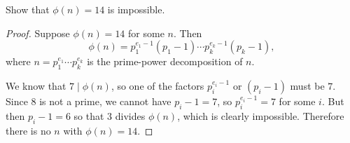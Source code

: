  Show that $\phi(n) = 14$ is impossible.
\begin{proof}
  Suppose $\phi(n) = 14$ for some $n$. Then
  \begin{equation*}
    \phi(n) = p_1^{e_1-1}(p_1 - 1)\cdots p_k^{e_k-1}(p_k - 1),
  \end{equation*}
  where $n = p_1^{e_1}\cdots p_k^{e_k}$ is the prime-power
  decomposition of $n$.

  We know that $7\mid\phi(n)$, so one of the factors $p_i^{e_i-1}$ or
  $(p_i-1)$ must be $7$. Since $8$ is not a prime, we cannot have
  $p_i - 1 = 7$, so $p_i^{e_i - 1} = 7$ for some $i$. But then
  $p_i - 1 = 6$ so that $3$ divides $\phi(n)$, which is clearly
  impossible. Therefore there is no $n$ with $\phi(n) = 14$.
\end{proof}
